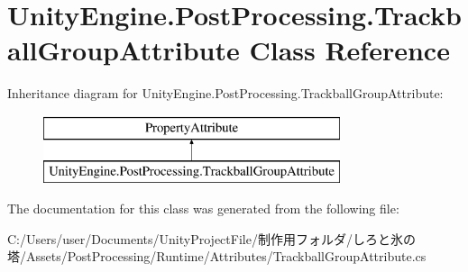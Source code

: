 \hypertarget{class_unity_engine_1_1_post_processing_1_1_trackball_group_attribute}{}\section{Unity\+Engine.\+Post\+Processing.\+Trackball\+Group\+Attribute Class Reference}
\label{class_unity_engine_1_1_post_processing_1_1_trackball_group_attribute}
Inheritance diagram for Unity\+Engine.\+Post\+Processing.\+Trackball\+Group\+Attribute\+:\begin{figure}[H]
\begin{center}
\leavevmode
\includegraphics[height=2.000000cm]{class_unity_engine_1_1_post_processing_1_1_trackball_group_attribute}
\end{center}
\end{figure}


The documentation for this class was generated from the following file\+:\begin{DoxyCompactItemize}
\item 
C\+:/\+Users/user/\+Documents/\+Unity\+Project\+File/制作用フォルダ/しろと氷の塔/\+Assets/\+Post\+Processing/\+Runtime/\+Attributes/Trackball\+Group\+Attribute.\+cs\end{DoxyCompactItemize}
